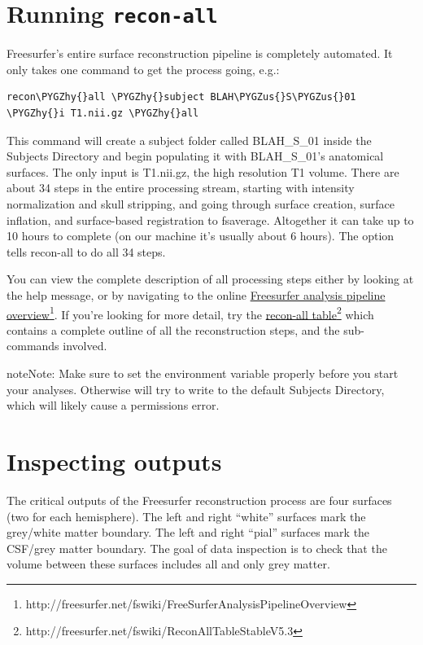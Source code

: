 \documentclass[letterpaper,10pt,openany,oneside]{sphinxmanual}
\def\PYGZus{\char`\_}
\def\PYGZhy{\char`\-}
\begin{document}
\section{Running \texttt{recon-all}}
\label{surface_reconstruction:running-recon-all}\label{surface_reconstruction:freesurfer-output-inspection-tutorial}
Freesurfer's entire surface reconstruction pipeline is completely automated. It
only takes one command to get the process going, e.g.:

\begin{Verbatim}[commandchars=\\\{\}]
recon\PYGZhy{}all \PYGZhy{}subject BLAH\PYGZus{}S\PYGZus{}01 \PYGZhy{}i T1.nii.gz \PYGZhy{}all
\end{Verbatim}

This command will create a subject folder called BLAH\_S\_01 inside the Subjects
Directory and begin populating it with BLAH\_S\_01's anatomical surfaces. The
only input is T1.nii.gz, the high resolution T1 volume. There are about 34
steps in the entire processing stream, starting with intensity normalization
and skull stripping, and going through surface creation, surface inflation, and
surface-based registration to fsaverage. Altogether it can take up to 10 hours
to complete (on our machine it's usually about 6 hours). The  option
tells recon-all to do all 34 steps.

You can view the complete description of all processing steps either by looking
at the  help message, or by navigating to the online \href{http://freesurfer.net/fswiki/FreeSurferAnalysisPipelineOverview}{Freesurfer
analysis pipeline overview}\footnote{http://freesurfer.net/fswiki/FreeSurferAnalysisPipelineOverview}. If you're looking for more detail, try the
\href{http://freesurfer.net/fswiki/ReconAllTableStableV5.3}{recon-all table}\footnote{http://freesurfer.net/fswiki/ReconAllTableStableV5.3} which contains a complete outline of all the reconstruction
steps, and the sub-commands involved.

\begin{notice}{note}{Note:}
Make sure to set the  environment variable properly
before you start your analyses. Otherwise  will try to write to
the default Subjects Directory, which will likely cause a permissions error.
\end{notice}


\section{Inspecting outputs}
\label{surface_reconstruction:recon-all-table}\label{surface_reconstruction:inspecting-outputs}
The critical outputs of the Freesurfer reconstruction process are four surfaces
(two for each hemisphere). The left and right ``white'' surfaces mark the
grey/white matter boundary. The left and right ``pial'' surfaces mark the
CSF/grey matter boundary. The goal of data inspection is to check that the
volume between these surfaces includes all and only grey matter.
\end{document}
